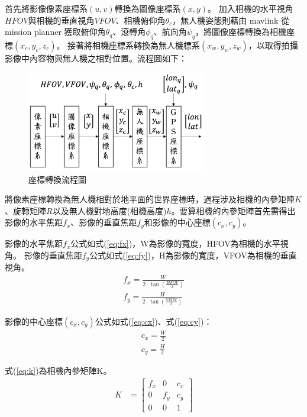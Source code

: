 \documentclass[12pt]{article}       %
\begin{document}
首先將影像像素座標系$(u,v)$轉換為圖像座標系$(x,y)$。
加入相機的水平視角$HFOV$與相機的垂直視角$VFOV$、相機俯仰角$\theta_{c}$，無人機姿態則藉由 mavlink 從 mission planner 獲取俯仰角$\theta_{q}$、滾轉角$\phi_{q}$、航向角$\psi_{q}$，將圖像座標轉換為相機座標$(x_{c},y_{c},z_{c})$。
接著將相機座標系轉換為無人機標系$(x_w,y_w,z_w)$，以取得拍攝影像中內容物與無人機之相對位置。流程圖如下：
\begin{figure}[H]
    \centering
    \includegraphics[width=0.7\textwidth]{pt.jpg}     %
    \caption{座標轉換流程圖}    %
    \label{fig:pt}    %
\end{figure}

將像素座標轉換為無人機相對於地平面的世界座標時，過程涉及相機的內參矩陣$K$、旋轉矩陣$R$以及無人機對地高度(相機高度)$h$。要算相機的內參矩陣首先需得出影像的水平焦距$f_{x}$、影像的垂直焦距$f_{y}$和影像的中心座標$(c_x,c_y)$。

影像的水平焦距$f_{x}$公式如式(\ref{eq:fx})，W為影像的寬度，HFOV為相機的水平視角。
影像的垂直焦距$f_{y}$公式如式(\ref{eq:fy})，H為影像的寬度，VFOV為相機的垂直視角。
\begin{align}
    f_{x}=\frac{W}{2\cdot\tan\left(\frac{HFOV}{2}\right)}
    \label{eq:fx}
    \\
    f_{y}=\frac{H}{2\cdot\tan\left(\frac{VFOV}{2}\right)}
    \label{eq:fy}
\end{align}

影像的中心座標$(c_x,c_y)$公式如式(\ref{eq:cx})、式(\ref{eq:cy})：
\begin{align}
    c_{x}=\frac{W}{2}
    \label{eq:cx}
    \\
    c_{y}=\frac{H}{2}
    \label{eq:cy}
\end{align}

式(\ref{eq:k})為相機內參矩陣K。
\begin{align}
    K &=
    \begin{bmatrix}
        f_{x}       & 0             & c_{x}     \\
        0           & f_{y}         & c_{y}     \\
        0           & 0             & 1
    \end{bmatrix} 
    \label{eq:k}
\end{align}
\end{document}
